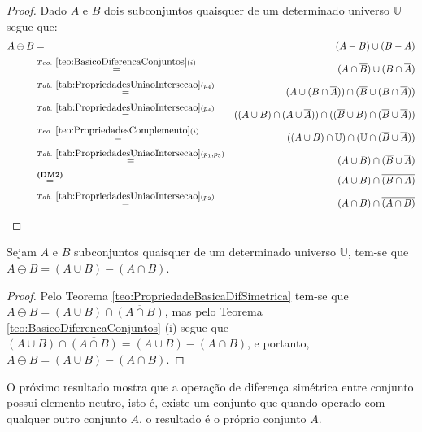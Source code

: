 \begin{proof}
	Dado $A$ e $B$ dois subconjuntos quaisquer de um determinado universo $\mathbb{U}$ segue que:
	\begin{eqnarray*}
		A \ominus B & = &  (A - B) \cup (B - A)\\
		& \stackrel{Teo. \  \ref{teo:BasicoDiferencaConjuntos}(i)}{=} & (A \cap \overline{B}) \cup (B \cap \overline{A})\\
		& \stackrel{Tab. \ \ref{tab:PropriedadesUniaoIntersecao}(p_4)}{=}& (A \cup (B \cap \overline{A})) \cap (\overline{B} \cup (B \cap \overline{A}))\\
		& \stackrel{Tab. \ \ref{tab:PropriedadesUniaoIntersecao}(p_4)}{=}& ((A \cup B) \cap (A \cup \overline{A})) \cap ((\overline{B} \cup B) \cap (\overline{B} \cup \overline{A}))\\
		& \stackrel{Teo. \ \ref{teo:PropriedadesComplemento}(i)}{=}& ((A \cup B) \cap \mathbb{U}) \cap (\mathbb{U} \cap (\overline{B} \cup \overline{A}))\\
		& \stackrel{Tab. \ \ref{tab:PropriedadesUniaoIntersecao}(p_1, p_5)}{=}& (A \cup B) \cap (\overline{B} \cup \overline{A})\\
		& \stackrel{\textbf{(DM2)}}{=}& (A \cup B) \cap \overline{(B \cap A)}\\
		& \stackrel{Tab. \ \ref{tab:PropriedadesUniaoIntersecao}(p_2)}{=}& (A \cap B) \cap \overline{(A \cap B)}
	\end{eqnarray*}
\end{proof}

\begin{corollary}\label{col:DiferencaSimetrica}
	Sejam $A$ e $B$ subconjuntos quaisquer de um determinado universo $\mathbb{U}$, tem-se que $A \ominus B = (A \cup B) - (A \cap B)$.
\end{corollary}

\begin{proof}
	Pelo Teorema \ref{teo:PropriedadeBasicaDifSimetrica} tem-se que $A \ominus B = (A \cup B) \cap \overline{(A \cap B)}$, mas pelo Teorema \ref{teo:BasicoDiferencaConjuntos} (i) segue que $(A \cup B) \cap \overline{(A \cap B)} = (A \cup B) - (A \cap B)$, e portanto, $A \ominus B = (A \cup B) - (A \cap B)$.
\end{proof}

O próximo resultado mostra que a operação de diferença simétrica entre conjunto possui elemento neutro, isto é, existe um conjunto que quando operado com qualquer outro conjunto $A$, o resultado é o próprio conjunto $A$.

